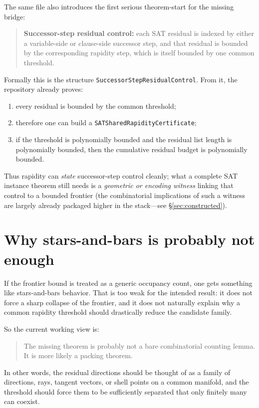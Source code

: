 \documentclass[11pt]{article}
\begin{document}
The same file also introduces the first serious theorem-start for the missing bridge:

\begin{quote}
\textbf{Successor-step residual control:} each SAT residual is indexed by either a
variable-side or clause-side successor step, and that residual is bounded by the
corresponding rapidity step, which is itself bounded by one common threshold.
\end{quote}

Formally this is the structure \texttt{SuccessorStepResidualControl}. From it, the
repository already proves:

\begin{enumerate}[leftmargin=2em]
  \item every residual is bounded by the common threshold;
  \item therefore one can build a \texttt{SATSharedRapidityCertificate};
  \item if the threshold is polynomially bounded and the residual list length is
  polynomially bounded, then the cumulative residual budget is polynomially bounded.
\end{enumerate}

Thus rapidity can \emph{state} successor-step control cleanly; what a complete SAT
instance theorem still needs is a \emph{geometric or encoding witness} linking that
control to a bounded frontier (the combinatorial implications of such a witness are
largely already packaged higher in the stack---see \S\ref{sec:constructed}).

\section{Why stars-and-bars is probably not enough}

If the frontier bound is treated as a generic occupancy count, one gets something like
stars-and-bars behavior. That is too weak for the intended result: it does not force a
sharp collapse of the frontier, and it does not naturally explain why a common rapidity
threshold should drastically reduce the candidate family.

So the current working view is:

\begin{quote}
The missing theorem is probably not a bare combinatorial counting lemma. It is more
likely a packing theorem.
\end{quote}

In other words, the residual directions should be thought of as a family of directions,
rays, tangent vectors, or shell points on a common manifold, and the threshold should
force them to be sufficiently separated that only finitely many can coexist.
\end{document}
